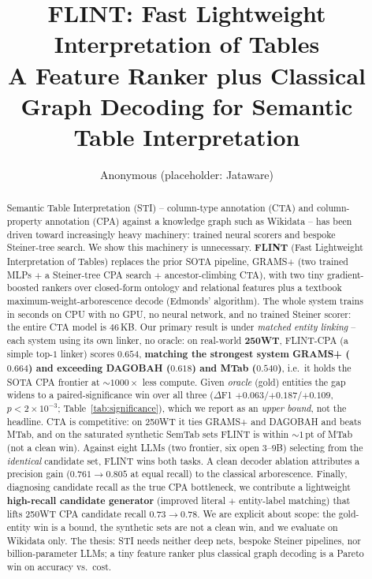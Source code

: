 \documentclass[11pt]{article}
\title{FLINT: Fast Lightweight Interpretation of Tables\\
\large A Feature Ranker plus Classical Graph Decoding for Semantic Table Interpretation}
\author{Anonymous (placeholder: Jataware)}
\date{}
\begin{document}
\maketitle

\begin{abstract}
Semantic Table Interpretation (STI) -- column-type annotation (CTA) and
column-property annotation (CPA) against a knowledge graph such as Wikidata --
has been driven toward increasingly heavy machinery: trained neural scorers and
bespoke Steiner-tree search. We show this machinery is unnecessary. \textbf{FLINT}
(Fast Lightweight Interpretation of Tables) replaces the prior SOTA pipeline,
GRAMS+ \cite{vu2024gramsplus} (two trained MLPs $+$ a Steiner-tree CPA search $+$
ancestor-climbing CTA), with two tiny gradient-boosted rankers over closed-form
ontology and relational features plus a textbook maximum-weight-arborescence decode
(Edmonds' algorithm). The whole system trains in seconds on CPU with no GPU, no
neural network, and no trained Steiner scorer: the entire CTA model is $46$\,KB.
Our primary result is under \emph{matched entity linking} -- each system using its own
linker, no oracle: on real-world \textbf{250WT}, FLINT-CPA (a simple top-$1$ linker)
scores $0.654$, \textbf{matching the strongest system GRAMS+ ($0.664$) and exceeding
DAGOBAH ($0.618$) and MTab ($0.540$)}, i.e.\ it holds the SOTA CPA frontier at
$\sim$$1000\times$ less compute. Given \emph{oracle} (gold) entities the gap widens to a
paired-significance win over all three ($\Delta$F1 $+0.063$/$+0.187$/$+0.109$,
$p<2\times10^{-3}$; Table~\ref{tab:significance}), which we report as an \emph{upper
bound}, not the headline. CTA is competitive: on 250WT it ties GRAMS+ and DAGOBAH and
beats MTab, and on the saturated synthetic SemTab sets FLINT is within $\sim$$1$\,pt of
MTab (not a clean win). Against eight LLMs (two frontier, six open $3$--$9$B) selecting
from the \emph{identical} candidate set, FLINT wins both tasks. A clean decoder ablation
attributes a precision gain ($0.761\!\to\!0.805$ at equal recall) to the classical
arborescence. Finally, diagnosing candidate recall as the true CPA bottleneck, we
contribute a lightweight \textbf{high-recall candidate generator} (improved literal $+$
entity-label matching) that lifts 250WT CPA candidate recall $0.73\!\to\!0.78$. We are
explicit about scope: the gold-entity win is a bound, the synthetic sets are not a clean
win, and we evaluate on Wikidata only. The thesis: STI needs neither deep nets, bespoke
Steiner pipelines, nor billion-parameter LLMs; a tiny feature ranker plus classical
graph decoding is a Pareto win on accuracy vs.\ cost.
\end{abstract}
\end{document}
